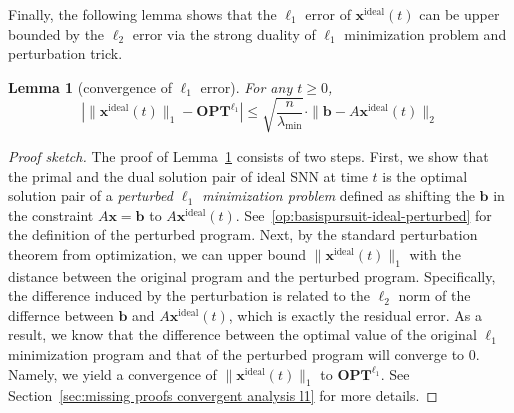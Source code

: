 \documentclass[11pt]{article}
\newtheorem{lemma}{Lemma}[section]
\theoremstyle{remark}
\theoremstyle{definition}
\newcommand{\bx}{\mathbf{x}}
\newcommand{\bb}{\mathbf{b}}
\newcommand{\OPT}{\mathbf{OPT}}
\begin{document}
Finally, the following lemma shows that the $\ell_1$ error of $\bx^\text{ideal}(t)$ can be upper bounded by the $\ell_2$ error via the strong duality of $\ell_1$ minimization problem and perturbation trick.
\begin{lemma}[convergence of $\ell_1$ error]\label{lemma:idealalgorithm-OPTbounds}
	For any $t\geq0$,
	\begin{equation}
	\left|\|\bx^{\text{ideal}}(t)\|_1-\OPT^{\ell_1}\right|\leq\sqrt{\frac{n}{\lambda_{\min}}}\cdot\|\bb-A\bx^{\text{ideal}}(t)\|_2
	\end{equation}
\end{lemma}
\begin{proof}[Proof sketch]
	The proof of Lemma~\ref{lemma:idealalgorithm-OPTbounds} consists of two steps. First, we show that the primal and the dual solution pair of ideal SNN at time $t$ is the optimal solution pair of a \textit{perturbed $\ell_1$ minimization problem} defined as shifting the $\bb$ in the constraint $A\bx=\bb$ to $A\bx^{\text{ideal}}(t)$. See~\eqref{op:basispursuit-ideal-perturbed} for the definition of the perturbed program. Next, by the standard perturbation theorem from optimization, we can upper bound $\|\bx^{\text{ideal}}(t)\|_1$ with the distance between the original program and the perturbed program. Specifically, the difference induced by the perturbation is related to the $\ell_2$ norm of the differnce between $\bb$ and $A\bx^{\text{ideal}}(t)$, which is exactly the residual error. As a result, we know that the difference between the optimal value of the original $\ell_1$ minimization program and that of the perturbed program will converge to 0. Namely, we yield a convergence of $\|\bx^{\text{ideal}}(t)\|_1$ to $\OPT^{\ell_1}$. See Section~\ref{sec:missing proofs convergent analysis l1} for more details.
\end{proof}
\end{document}
